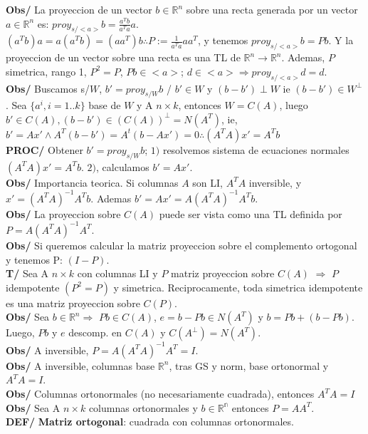 \documentclass[10pt,a4paper]{article}
\begin{document}
\textbf{Obs/} La proyeccion de un vector $b \in \mathbb{R}^n$ sobre una recta generada por un vector $a \in \mathbb{R}^n$ es: $proy_{s/<a>}b = \frac{a^Tb}{a^Ta}a$.\\
$(a^Tb)a=a(a^Tb)=(aa^T)b \therefore P := \frac{1}{a^Ta}aa^T$, y tenemos $proy_{s/<a>}b = Pb$. Y la proyeccion de un vector sobre una recta es una TL de $\mathbb{R}^n \rightarrow \mathbb{R}^n$. Ademas, $P$ simetrica, rango 1, $P^2 = P$, $Pb \in <a>$; $d \in <a> \Rightarrow proy_{s/<a>}d=d$.\\
\textbf{Obs/} Buscamos s/$W$, $b' = proy_{s/W}b$ / $b' \in W $ y $(b-b') \perp W$ ie $(b-b') \in W^\perp$. Sea $\{a^i, i=1..k\}$ base de $W$ y A $n \times k$, entonces $W = C(A)$, luego $b' \in C(A), (b-b') \in (C(A))^\perp = N(A^T)$, ie, $b'=Ax' \land A^T(b-b')=A^t(b-Ax')=0 \therefore (A^TA)x'=A^Tb$\\
\textbf{PROC/} Obtener $b' = proy_{s/W}b$; $1)$ resolvemos sistema de ecuaciones normales $(A^TA)x'=A^Tb$. $2)$, calculamos $b'=Ax'$.\\
\textbf{Obs/} Importancia teorica. Si columnas $A$ son LI, $A^TA$ inversible, y $x' = (A^TA)^{-1}A^Tb$. Ademas $b' = Ax' = A(A^TA)^{-1}A^Tb$.\\
\textbf{Obs/} La proyeccion sobre $C(A)$ puede ser vista como una TL definida por $P=A(A^TA)^{-1}A^T$.\\
\textbf{Obs/} Si queremos calcular la matriz proyeccion sobre el complemento ortogonal y tenemos P: $(I-P)$.\\
\textbf{T/} Sea A $n \times k$ con columnas LI y $P$ matriz proyeccion sobre $C(A)$ $\Rightarrow$ $P$ idempotente $(P^2 = P)$ y simetrica. Reciprocamente, toda simetrica idempotente es una matriz proyeccion sobre $C(P)$.\\
\textbf{Obs/} Sea $b \in \mathbb{R}^n \Rightarrow$ $Pb \in C(A)$, $e = b-Pb \in N(A^T)$ y $b=Pb+(b-Pb)$. Luego, $Pb$ y $e$ descomp. en $C(A)$ y $C(A^\perp)=N(A^T)$.\\
\textbf{Obs/} A inversible, $P = A(A^TA)^{-1}A^T = I$.\\
\textbf{Obs/} A inversible, columnas base $\mathbb{R}^n$, tras GS y norm, base ortonormal y $A^TA = I$.\\
\textbf{Obs/} Columnas ortonormales (no necesariamente cuadrada), entonces $A^TA = I$\\
\textbf{Obs/} Sea A $n \times k$ columnas ortonormales y $b \in \mathbb{R^n}$ entonces $P=AA^T$.\\
\textbf{DEF/} \textbf{Matriz ortogonal}: cuadrada con columnas ortonormales.\\
\end{document}

